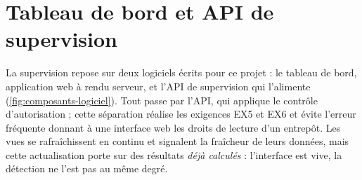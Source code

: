\section{Tableau de bord et API de supervision}
\label{sec:supervision}

La supervision repose sur deux logiciels écrits pour ce projet : le tableau de bord, application web
à rendu serveur, et l'API de supervision qui l'alimente (\cref{fig:composants-logiciel}). Tout passe
par l'API, qui applique le contrôle d'autorisation ; cette séparation réalise les exigences EX5 et
EX6 et évite l'erreur fréquente donnant à une interface web les droits de lecture d'un entrepôt. Les
vues se rafraîchissent en continu et signalent la fraîcheur de leurs données, mais cette
actualisation porte sur des résultats \emph{déjà calculés} : l'interface est vive, la détection ne
l'est pas au même degré.

